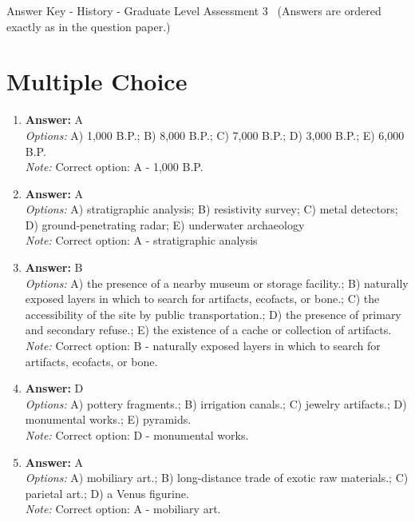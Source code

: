 \documentclass[12pt]{article}
\begin{document}
\begin{center}
Answer Key - History - Graduate Level Assessment 3 \
\small (Answers are ordered exactly as in the question paper.)
\end{center}

\section*{Multiple Choice}
\begin{enumerate}[label=\arabic*.]
\item \textbf{Answer:} A
\\ \textit{Options:} A) 1,000 B.P.; B) 8,000 B.P.; C) 7,000 B.P.; D) 3,000 B.P.; E) 6,000 B.P.
\\ \textit{Note:} Correct option: A - 1,000 B.P.
\item \textbf{Answer:} A
\\ \textit{Options:} A) stratigraphic analysis; B) resistivity survey; C) metal detectors; D) ground-penetrating radar; E) underwater archaeology
\\ \textit{Note:} Correct option: A - stratigraphic analysis
\item \textbf{Answer:} B
\\ \textit{Options:} A) the presence of a nearby museum or storage facility.; B) naturally exposed layers in which to search for artifacts, ecofacts, or bone.; C) the accessibility of the site by public transportation.; D) the presence of primary and secondary refuse.; E) the existence of a cache or collection of artifacts.
\\ \textit{Note:} Correct option: B - naturally exposed layers in which to search for artifacts, ecofacts, or bone.
\item \textbf{Answer:} D
\\ \textit{Options:} A) pottery fragments.; B) irrigation canals.; C) jewelry artifacts.; D) monumental works.; E) pyramids.
\\ \textit{Note:} Correct option: D - monumental works.
\item \textbf{Answer:} A
\\ \textit{Options:} A) mobiliary art.; B) long-distance trade of exotic raw materials.; C) parietal art.; D) a Venus figurine.
\\ \textit{Note:} Correct option: A - mobiliary art.
\end{enumerate}
\end{document}
